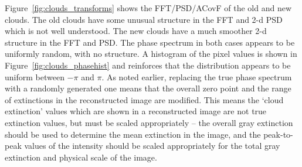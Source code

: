\documentclass[11pt,preprint]{aastex}
\begin{document}
Figure~\ref{fig:clouds_transforms} shows the FFT/PSD/ACovF of the old and new clouds. The old clouds have some unusual structure in the FFT and 2-d PSD which is not well understood. The new clouds have a much smoother 2-d structure in the FFT and PSD. The phase spectrum in both cases appears to be uniformly random, with no structure. A histogram of the pixel values is shown in Figure~\ref{fig:clouds_phasehist} and reinforces that the distribution appears to be uniform between $-\pi$ and $\pi$.  As noted earlier, replacing the true phase spectrum with a randomly generated one means that the overall zero point and the range of extinctions in the reconstructed image are modified. This means the `cloud extinction' values which are shown in a reconstructed image are not true extinction values, but must be scaled appropriately -- the overall gray extinction should be used to determine the mean extinction in the image, and the peak-to-peak values of the intensity should be scaled appropriately for the total gray extinction and physical scale of the image. 
\end{document}
